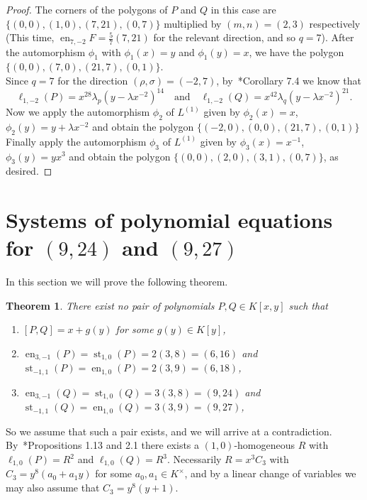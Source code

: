 \documentclass[reqno,a4paper,twoside]{amsart}
\newtheorem{theorem}{Theorem}[section]
\theoremstyle{definition}
\theoremstyle{remark}
\DeclareMathOperator{\en}{en}
\DeclareMathOperator{\st}{st}
\begin{document}
\begin{proof}
The corners of the polygons of $P$ and $Q$ in this case are $\{ (0,0), (1,0), (7,21), (0,7) \}$ multiplied by $(m,n) = (2,3)$ respectively (This time, $\en_{7,-2} F = \frac{5}{7}(7,21)$ for the relevant direction, and so $q=7$).
After the automorphism $\phi_1$ with $\phi_1(x) = y$ and $\phi_1(y) = x$, we have the polygon $\{ (0,0), (7,0), (21,7), (0,1) \}$. \\
Since $q=7$ for the direction $(\rho,\sigma)=(-2,7)$, by~\cite{GGV1}*{Corollary 7.4} we know that
$$
\ell_{1,-2}(P)=x^{28}\lambda_p (y-\lambda x^{-2})^{14}\quad\text{and}\quad\ell_{1,-2}(Q)=x^{42}\lambda_q (y-\lambda x^{-2})^{21}.
$$
Now we apply the automorphism $\phi_2$ of $L^{(1)}$ given by $\phi_2(x) = x$, $\phi_2(y) = y +\lambda x^{-2}$ and obtain the polygon $\{ (-2,0), (0,0), (21,7), (0,1) \}$
Finally apply the automorphism $\phi_3$ of $L^{(1)}$ given by $\phi_3(x) = x^{-1}$, $\phi_3(y) = y x^3$ and obtain the polygon $\{ (0,0), (2,0), (3,1), (0,7) \}$, as desired.
\end{proof}
\newpage

\section{Systems of polynomial equations for $(9,24)$ and $(9,27)$}
\label{seccion 4}
In this section we will prove the following theorem.
\begin{theorem}\label{teorema impossible}
There exist no pair of polynomials $P,Q\in K[x,y]$ such that
\begin{enumerate}
  \item $[P,Q]=x+g(y)$ for some $g(y)\in K[y]$,
  \item $\en_{3,-1}(P)=\st_{1,0}(P)= 2(3,8)=(6,16)$ and $\st_{-1,1}(P)=\en_{1,0}(P)= 2(3,9)=(6,18)$,
  \item $\en_{3,-1}(Q)=\st_{1,0}(Q)= 3(3,8)=(9,24)$ and $\st_{-1,1}(Q)=\en_{1,0}(Q)= 3(3,9)=(9,27)$,
\end{enumerate}
\end{theorem}

So we assume that such a pair exists, and we will  arrive at a contradiction.
By~\cite{GGV1}*{Propositions 1.13 and 2.1} there exists a $(1,0)$-homogeneous $R$ with $\ell_{1,0}(P)= R^2$ and $\ell_{1,0}(Q)=R^3$. Necessarily $R=x^3 C_3$ with $C_3= y^8(a_0+a_1 y)$
for some $a_0,a_1\in K^{\times}$,
and by a linear change of variables we may also assume that $C_3= y^8 (y+1)$.
\end{document}

